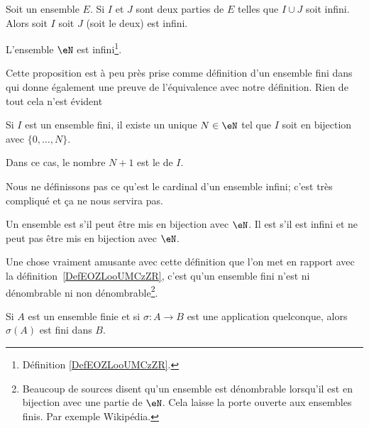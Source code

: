 \begin{lemma}       \label{LEMooYHGCooAwsVQN}
    Soit un ensemble \( E\). Si \( I\) et \( J\) sont deux parties de \( E\) telles que \( I\cup J\) soit infini. Alors soit \( I\) soit \( J\) (soit le deux) est infini.
\end{lemma}

\begin{proposition}     \label{PROPooBYKCooGDkfWy}
    L'ensemble \( \eN\) est infini\footnote{Définition \ref{DefEOZLooUMCzZR}.}.
\end{proposition}

Cette proposition est à peu près prise comme définition d'un ensemble fini dans \cite{ooVAYLooJxVYex} qui donne également une preuve de l'équivalence avec notre définition. Rien de tout cela n'est évident
\begin{propositionDef}     \label{PROPooJLGKooDCcnWi}
    Si \( I\) est un ensemble fini, il existe un unique \( N\in \eN\) tel que \( I\) soit en bijection avec \( \{ 0,\ldots, N \}\).

    Dans ce cas, le nombre \( N+1\) est le  de \( I\). 
\end{propositionDef}

Nous ne définissons pas ce qu'est le cardinal d'un ensemble infini; c'est très compliqué et ça ne nous servira pas.

\begin{definition}\label{DefEnsembleDenombrable}
    Un ensemble est  s'il peut être mis en bijection avec \( \eN\). Il est  s'il est infini et ne peut pas être mis en bijection avec \( \eN\).
\end{definition}
Une chose vraiment amusante avec cette définition que l'on met en rapport avec la définition~\ref{DefEOZLooUMCzZR}, c'est qu'un ensemble fini n'est ni dénombrable ni non dénombrable\footnote{Beaucoup de sources disent qu'un ensemble est dénombrable lorsqu'il est en bijection avec une partie de \( \eN\). Cela laisse la porte ouverte aux ensembles finis. Par exemple Wikipédia\cite{ooLMVKooUiQUtb}.}.

\begin{lemma}       \label{LEMooGRGFooSWDeMA}
    Si \( A\) est un ensemble finie et si \( \sigma\colon A\to B\) est une application quelconque, alors \( \sigma(A)\) est fini dans \( B\).
\end{lemma}


